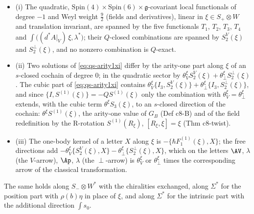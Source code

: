 \begin{proposition}
\label{prop:qs-freexi}
\begin{itemize}
\item (i) The quadratic, $\mathrm{Spin}(4)\times\mathrm{Spin}(6)\times\mathfrak g$-covariant local functionals of degree $-1$ and Weyl weight $\tfrac92$ (fields and derivatives), linear in $\xi\in S_+\otimes W$ and translation invariant, are spanned by the five functionals $T_1$, $T_2$, $T_3$, $T_4$ and $\int\big((d^*A|_V)\,\xi,\lambda^*\big)$; their $Q$-closed combinations are spanned by $S^V_2(\xi)$ and $S^\perp_2(\xi)$, and no nonzero combination is $Q$-exact.
\item (ii) Two solutions of \eqref{eq:qs-arity1xi} differ by the arity-one part along $\xi$ of an $s$-closed cochain of degree $0$; in the quadratic sector by $\theta^\xi_VS^V_2(\xi)+\theta^\xi_\perp S^\perp_2(\xi)$. The cubic part of \eqref{eq:qs-arity1xi} contains $\theta^\xi_V\{I_3,S^V_2(\xi)\}+\theta^\xi_\perp\{I_3,S^\perp_2(\xi)\}$, and since $\{I,S^{(1)}(\xi)\}=-QS^{(1)}(\xi)$ only the combination with $\theta^\xi_V=\theta^\xi_\perp$ extends, with the cubic term $\theta^\xi S_3(\xi)$, to an $s$-closed direction of the cochain: $\theta^\xi S^{(1)}(\xi)$, the arity-one value of $G_B$ (Def c8-B) and of the field redefinition by the R-rotation $S^{(1)}(R_\xi)$, $[R_\xi,\xi]=\xi$ (Thm c8-twist).
\item (iii) The one-body kernel of a letter $X$ along $\xi$ is $-\{\hbar F_1^{(1)}(\xi),X\}$; the free directions add $-\theta^\xi_V\{S^V_2(\xi),X\}-\theta^\xi_\perp\{S^\perp_2(\xi),X\}$, which on the letters $\AV$, $\lambda$ (the $V$-arrow), $\Ap$, $\lambda$ (the $\perp$-arrow) is $\theta^\xi_V$ or $\theta^\xi_\perp$ times the corresponding arrow of the classical transformation.
\end{itemize}
The same holds along $S_-\otimes W^*$ with the chiralities exchanged, along $\Sigma^*$ for the position part with $\rho(b)\eta$ in place of $\xi$, and along $\Sigma^*$ for the intrinsic part with the additional direction $\int s_0$.
\end{proposition}

